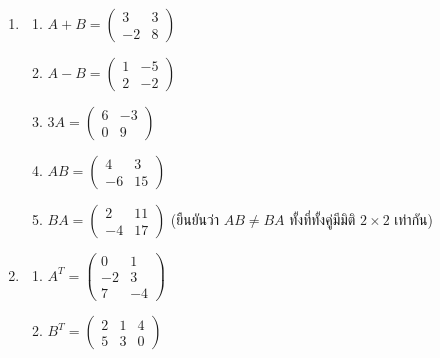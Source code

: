 \begin{enumerate}[label={},leftmargin=0pt,start=3]
    \item
    \begin{enumerate}[label=\textbf{\thechapter.\arabic{enumi}.\arabic*}]
        \item $A+B = \begin{pmatrix}3 & 3\\ -2 & 8\end{pmatrix}$
        \item $A-B = \begin{pmatrix}1 & -5\\ 2 & -2\end{pmatrix}$
        \item $3A = \begin{pmatrix}6 & -3\\ 0 & 9\end{pmatrix}$
        \item $AB = \begin{pmatrix}4 & 3\\ -6 & 15\end{pmatrix}$
        \item $BA = \begin{pmatrix}2 & 11\\ -4 & 17\end{pmatrix}$ (ยืนยันว่า $AB\neq BA$ ทั้งที่ทั้งคู่มีมิติ $2\times 2$ เท่ากัน)
    \end{enumerate}

    \item
    \begin{enumerate}[label=\textbf{\thechapter.\arabic{enumi}.\arabic*}]
        \item $A^T = \begin{pmatrix}0 & 1\\ -2 & 3\\ 7 & -4\end{pmatrix}$
        \item $B^T = \begin{pmatrix}2 & 1 & 4\\ 5 & 3 & 0\end{pmatrix}$
    \end{enumerate}
\end{enumerate}

